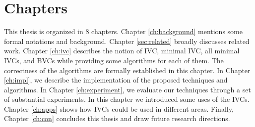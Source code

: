 %
%
%


\section{Chapters}
This thesis is organized in 8 chapters. Chapter \ref{ch:background} mentions some formal notations and background. Chapter \ref{sec:related} broadly discusses related work. Chapter \ref{ch:ivc} describes the notion of IVC, minimal IVC, all minimal IVCs, and BVCs while providing some algorithms for each of them. The correctness of the algorithms are formally established in this chapter.
In Chapter \ref{ch:impl}, we describe the implementation of the proposed techniques and algorithms.  In Chapter \ref{ch:experiment}, we evaluate our techniques through a set of substantial experiments.
In this chapter we introduced some uses of the IVCs. Chapter \ref{ch:apps} shows how IVCs could be used in different areas.
Finally, Chapter \ref{ch:con} concludes this thesis and draw future research directions.

